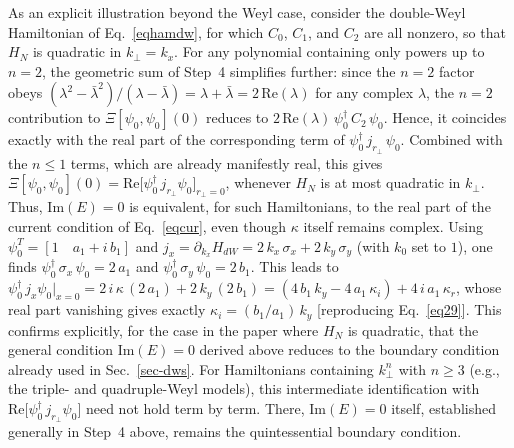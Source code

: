 \documentclass[aps,prb,onecolumn, footinbib, 10pt]{revtex4-2}
\begin{document}
{{\begin{itemize}
\end{itemize}

As an explicit illustration beyond the Weyl case, consider the double-Weyl Hamiltonian of Eq.~\eqref{eqhamdw}, for which $C_0$, $C_1$, and $C_2$ are all nonzero, so that $H_N$ is quadratic in $k_\perp=k_x$. For any polynomial containing only powers up to $n=2$, the geometric sum of Step~4 simplifies further: since the $n=2$ factor obeys $(\lambda^2-\bar\lambda^2)/(\lambda-\bar\lambda)=\lambda+\bar\lambda=2\,\mathrm{Re}(\lambda)$ for any complex $\lambda$, the $n=2$ contribution to $\Xi[\psi_0,\psi_0](0)$ reduces to $2\,\mathrm{Re}(\lambda)\,\psi_0^\dagger \,  C_2 \, \psi_0$. Hence, it coincides exactly with the real part of the corresponding term of $\psi_0^\dagger \,j_{r_\perp}\, \psi_0$. Combined with the $n\le1$ terms, which are already manifestly real, this gives $\Xi[\psi_0,\psi_0](0)=\mathrm{Re}\big[\psi_0^\dagger  \, j_{r_\perp} \! \psi_0\big]_{r_\perp=0}$, whenever $H_N$ is at most quadratic in $k_\perp$. Thus, $\mathrm{Im}(E)=0$ is equivalent, for such Hamiltonians, to the real part of the current condition of Eq.~\eqref{eqcur}, even though $\kappa$ itself remains complex. Using $\psi_0^T=[1 \quad a_1+i\,b_1]$ and $j_x=\partial_{k_x}H_{dW}=2 \, k_x\,\sigma_x+2 \, k_y\,\sigma_y$ (with $k_0$ set to $1$), one finds $\psi_0^\dagger\,\sigma_x\,\psi_0=2\, a_1$ and $\psi_0^\dagger \, \sigma_y \, \psi_0=2 \,b_1$. This leads to $\psi_0^\dagger  \, j_x \! \psi_0\big\vert_{x=0}=2 \, i \, \kappa \, (2 \, a_1)+2 \, k_y \, (2 \, b_1)=(4 \, b_1 \, k_y-4 \, a_1 \, \kappa_i)+4 \, i \, a_1 \, \kappa_r$, whose real part vanishing gives exactly $\kappa_i=(b_1/a_1)\,k_y$ [reproducing Eq.~\eqref{eq29}]. This confirms explicitly, for the case in the paper where $H_N$ is quadratic, that the general condition $\mathrm{Im}(E)=0$ derived above reduces to the boundary condition already used in Sec.~\ref{sec-dws}. For Hamiltonians containing $k_\perp^n$ with $n\ge3$ (e.g., the triple- and quadruple-Weyl models), this intermediate identification with $\mathrm{Re}\big[\psi_0^\dagger  \, j_{r_\perp}\! \psi_0\big]$ need not hold term by term. There, $\mathrm{Im}(E)=0$ itself, established generally in Step~4 above, remains the quintessential boundary condition.
}}



  
\end{document}
